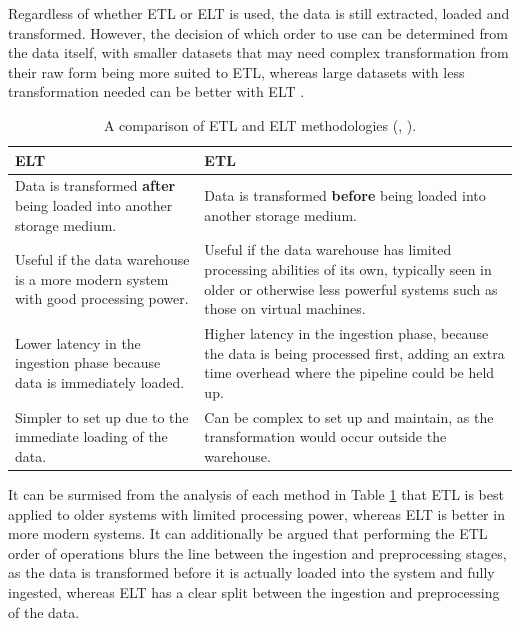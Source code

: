 \documentclass[12pt]{report}
\begin{document}
Regardless of whether ETL or ELT is used, the data is still extracted, loaded and transformed. However,
the decision of which order to use can be determined from the data itself, with smaller datasets that may need 
complex transformation from their raw form being more suited to ETL, whereas large datasets with less 
transformation needed can be better with ELT \autocite{smallcombe_etl_nodate}.

\begin{table}[H]
    \centering
        \begin{tabular}{ |p{}| p{}|}
            \hline
            \cellcolor{blue!25}ELT & \cellcolor{blue!25}ETL\\
            \hline
            Data is transformed \textbf{after} being loaded into another storage medium.
            & Data is transformed \textbf{before} being loaded into another storage medium. \\
            \hline
            Useful if the data warehouse is a more modern system with good processing power.
            & Useful if the data warehouse has limited processing abilities of its own,
            typically seen in older or otherwise less powerful systems such as those on 
            virtual machines.\\
            \hline
            Lower latency in the ingestion phase because data is immediately loaded. 
            & Higher latency in the ingestion phase, because the data is being processed first, 
            adding an extra time overhead where the pipeline could be held up.\\
            \hline 
            Simpler to set up due to the immediate loading of the data.
            & Can be complex to set up and maintain, as the transformation would occur outside the warehouse.\\
            \hline
    \end{tabular}
    \caption{A comparison of ETL and ELT methodologies (\textcite{bartley_etl_2024}, \textcite{aws_etl_nodate}).}\label{tab:ELT-ETL}
\end{table}

It can be surmised from the analysis of each method in Table \ref{tab:ELT-ETL} that ETL is best applied 
to older systems with limited processing power, whereas ELT is better in more modern systems. 
It can additionally be argued that performing the ETL order of operations blurs the line between the ingestion and 
preprocessing stages, as the data is transformed before it is actually loaded into the system and
fully ingested, whereas ELT has a clear split between the ingestion and preprocessing of the data. 
\end{document}
